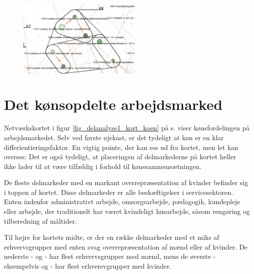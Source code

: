 %
\begin{figure}
  \vspace{-20pt}
  \begin{center}
    \includegraphics[width=6cm]{fig/segzoom/seg_4_9_timeloen.pdf}
   \caption{}
   \label{fig_delanalyse1_zoom_4_9}
  \end{center}
  \vspace{-20pt}
\end{figure}
%



\pagebreak 
\section{Det kønsopdelte arbejdsmarked \label{sec_delanalyse2 koensfordeling generelt}}




Netværkskortet i figur \ref{fig_delanalyse1_kort_koen} på s. \pageref{fig_delanalyse1_kort_koen} viser kønsfordelingen på arbejdsmarkedet. Selv ved første øjekast, er det tydeligt at køn er en klar differientieringsfaktor. 
En vigtig pointe, der kan ses ud fra kortet, men let kan overses: Det er også tydeligt, at placeringen af delmarkederne på kortet heller ikke lader til at være tilfældig i forhold til kønssammensætningen. 

De fleste delmarkeder med en markant overrepræsentation af kvinder befinder sig i toppen af kortet. Disse delmarkeder er alle beskæftigelser i servicesektoren. Enten indenfor administrativt arbejde, omsorgsarbejde, pædagogik, kundepleje eller arbejde, der traditionelt har været kvindeligt husarbejde, såsom rengøring og tilberedning af måltider.  

Til højre for kortets midte, er der en række delmarkeder med et miks af erhvervsgrupper med enten svag overrepræsentation af mænd eller af kvinder. De nederste -  og  - har flest erhvervsgrupper med mænd, mens de øverste - eksempelvis  og  - har flest erhversvgrupper med kvinder. 

